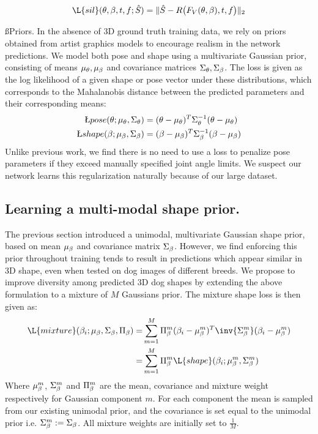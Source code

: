   \begin{equation}
  \L{sil}(\pose, \shape, \trans, \f; \hat{S}) = \lVert \hat{S} - R\bigl(F_{V}(\pose, \shape), \trans, \f \bigr) \rVert_{2}
  \end{equation}
  
  
  \ss{Priors.}
  In the absence of 3D ground truth training data, we rely on priors obtained from artist graphics models to encourage realism in the network predictions. We model both pose and shape using a multivariate Gaussian prior, consisting of means $\mu_{\theta},\mu_{\beta}$ and covariance matrices $\Sigma_{\theta},\Sigma_{\beta}$. The loss is given as the log likelihood of a given shape or pose vector under these distributions, which corresponds to the Mahalanobis distance between the predicted parameters and their corresponding means:
  \begin{align}
      \L{pose}(\pose; \mu_{\pose}, \Sigma_{\pose}) &= (\pose - \mu_{\pose})^T \Sigma_{\pose}^{-1} (\pose - \mu_{\pose})\\
      \L{shape}(\shape; \mu_{\shape}, \Sigma_{\shape}) &= (\shape - \mu_{\shape})^T \Sigma_{\shape}^{-1} (\shape - \mu_{\shape})
  \end{align}
  Unlike previous work, we find there is no need to use a loss to penalize pose parameters if they exceed manually specified joint angle limits. We suspect our network learns this regularization naturally because of our large dataset.
  
  
  \subsection{Learning a multi-modal shape prior.}
  
  The previous section introduced a unimodal, multivariate Gaussian shape prior, based on mean $\mu_{\beta}$ and covariance matrix $\Sigma_{\beta}$. However, we find enforcing this prior throughout training tends to result in predictions which appear similar in 3D shape, even when tested on dog images of different breeds. We propose to improve diversity among predicted 3D dog shapes by extending the above formulation to a mixture of $M$ Gaussians prior.  
  The mixture shape loss is then given as:
  \begin{align}
      \L{mixture}(\shape_{i}; \mu_{\shape}, \Sigma_{\shape}, \Pi_{\shape})
      =&
      \sum_{m=1}^M
      \Pi_{\shape}^m
      (\shape_{i} - \mu_{\shape}^{m})^{T} \inv{\Sigma_{\shape}^{m}} (\shape_{i} - \mu_{\shape}^{m})
      \\
      =&
      \sum_{m=1}^M \Pi_{\shape}^{m}\L{shape}(\shape_{i}; \mu_{\shape}^{m}, \Sigma_{\shape}^{m})
  \end{align}
  Where $\mu_{\beta}^{m}$, $\Sigma_{\beta}^{m}$ and $\Pi_{\beta}^{m}$ 
  are the mean, covariance and mixture weight respectively for Gaussian component 
  $m$. For each component the mean is sampled from our existing unimodal prior, and the covariance is set equal to the unimodal prior i.e. $\Sigma_{\beta}^{m} := \Sigma_{\beta}$. All mixture weights are initially set to $\frac{1}{M}$.
  
